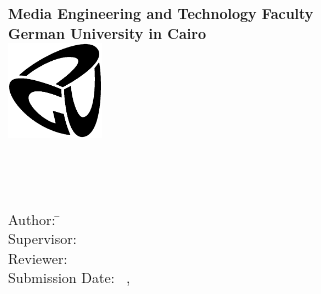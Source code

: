 \thispagestyle{empty}
\begin{center}
	\textbf{Media Engineering and Technology Faculty}\\[1mm]
	\textbf{German University in Cairo}\\[1mm]
	\includegraphics[width=2.5cm]{GUC-logo-ss.ps}
	
	\vspace{2cm}
	{\Huge \textbf{\titleOfThesisOne}}\\
	\vspace{2cm}
	{\large \textbf{\typeOfThesis}}\\
	
	\vspace{8cm}
	\parbox{1cm}{
  		\begin{large}
    			\begin{tabbing}
       			Author: \hspace{2cm}
        			\=\authorOfThesis\\[2mm]
      			Supervisor: 
        			\>\supervisorOne\\[2mm]
        		Reviewer: 
				\>\reviewerOne\\[1mm]
      			Submission Date: 
        			\>\submissionDay~\submissionMonth,~\submissionYear\\
    			\end{tabbing}
  		\end{large}
	}\\
\end{center}

